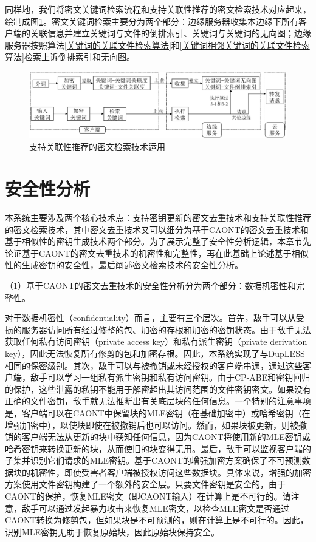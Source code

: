 \documentclass[promaster]{thesis-uestc}
\begin{document}
同样地，我们将密文关键词检索流程和支持关联性推荐的密文检索技术对应起来，绘制成图\ref{系统设计图2}。密文关键词检索主要分为两个部分：边缘服务器收集本边缘下所有客户端的关联信息并建立关键词与文件的倒排索引、关键词与关键词的无向图；边缘服务器按照算法\ref{关键词的关联文件检索算法}和\ref{关键词相邻关键词的关联文件检索算法}检索上诉倒排索引和无向图。

\begin{figure}[htbp]  
    \centering
    \includegraphics[width = 1.0\linewidth]{pic/系统设计2.png}
    \caption{支持关联性推荐的密文检索技术运用}
    \label{系统设计图2}
\end{figure}

\section{安全性分析}\label{安全性分析}
本系统主要涉及两个核心技术点：支持密钥更新的密文去重技术和支持关联性推荐的密文检索技术，其中密文去重技术又可以细分为基于CAONT的密文去重技术和基于相似性的密钥生成技术两个部分。为了展示完整了安全性分析逻辑，本章节先论证基于CAONT的密文去重技术的机密性和完整性，再在此基础上论述基于相似性的生成密钥的安全性，最后阐述密文检索技术的安全性分析。

（1）基于CAONT的密文去重技术的安全性分析分为两个部分：数据机密性和完整性。

对于数据机密性（confidentiality）而言，主要有三个层次。首先，敌手可以从受损的服务器访问所有经过修整的包、加密的存根和加密的密钥状态。由于敌手无法获取任何私有访问密钥（private access key）和私有派生密钥（private derivation key），因此无法恢复所有修剪的包和加密存根。因此，本系统实现了与DupLESS相同的保密级别。其次，敌手可以与被撤销或未经授权的客户端串通，通过这些客户端，敌手可以学习一组私有派生密钥和私有访问密钥。由于CP-ABE和密钥回归的保护，这些泄露的私钥不能用于解密超出其访问范围的文件密钥密文。如果没有正确的文件密钥，敌手就无法推断出有关底层块的任何信息。一个特别的注意事项是，客户端可以在CAONT中保留块的MLE密钥（在基础加密中）或哈希密钥（在增强加密中），以使块即使在被撤销后也可以访问。然而，如果块被更新，则被撤销的客户端无法从更新的块中获知任何信息，因为CAONT将使用新的MLE密钥或哈希密钥来转换更新的块，从而使旧的块变得无用。最后，敌手可以监视客户端的子集并识别它们请求的MLE密钥。基于CAONT的增强加密方案确保了不可预测数据块的机密性，即使受害者客户端被授权访问这些数据块。具体来说，增强的加密方案使用文件密钥构建了一个额外的安全层。只要文件密钥是安全的，由于CAONT的保护，恢复MLE密文（即CAONT输入）在计算上是不可行的。请注意，敌手可以通过发起暴力攻击来恢复MLE密文，以检查MLE密文是否通过CAONT转换为修剪包，但如果块是不可预测的，则在计算上是不可行的。因此，识别MLE密钥无助于恢复原始块，因此原始块保持安全。
\end{document}
